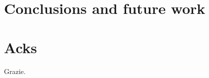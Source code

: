 \documentclass[12pt,twoside]{report}
\renewcommand{\chaptermark}[1]{\markboth{\thechapter.\ #1}{}}
\begin{document}



\clearpage{\pagestyle{empty}\cleardoublepage}

\clearpage{\pagestyle{empty}\cleardoublepage}
%
%
%
%


\clearpage{\pagestyle{empty}\cleardoublepage}
\chapter*{Conclusions and future work}
%




\printbibliography 
\clearpage{\pagestyle{empty}\cleardoublepage}
\chapter*{Acks} 
Grazie.
\end{document}

